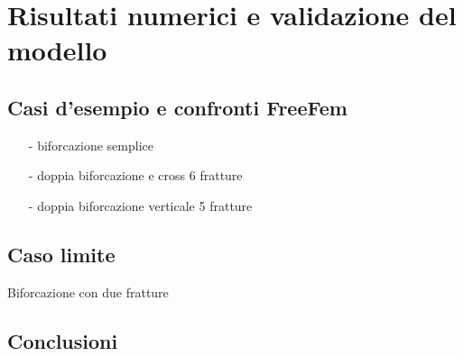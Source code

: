 \chapter{Risultati numerici e validazione del modello} 

\section{Casi d'esempio e confronti FreeFem}

\begin{enumerate}
\item[-] biforcazione semplice
\item[-] doppia biforcazione e cross 6 fratture
\item[-] doppia biforcazione verticale 5 fratture
\end{enumerate}

\section{Caso limite}
Biforcazione con due fratture

\section{Conclusioni}